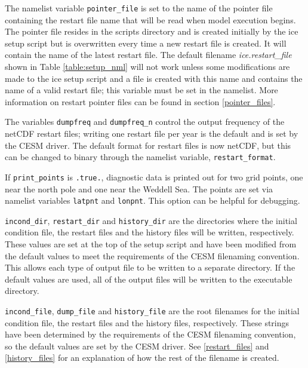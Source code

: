 The namelist variable {\tt pointer\_file} is set to the name of the pointer file
containing the restart file name that will be read when model execution
begins.  The pointer file resides in the scripts directory and is created 
initially by the ice setup script but is overwritten every time a new restart 
file is created.  It will contain the name of the latest restart file.  The 
default filename {\it ice.restart\_file} shown in Table 
\ref{table:setup_nml} will not work unless some modifications are made to 
the ice setup script and a file is created with this name and contains the name 
of a valid restart file; this variable must be set in the namelist.  More 
information on restart pointer files can be found in section \ref{pointer_files}.

The variables {\tt dumpfreq} and {\tt dumpfreq\_n} control the 
output frequency of the netCDF restart files; writing one restart file per 
year is the default and is set by the CESM driver. The default format for
restart files is now netCDF, but this can be changed to binary through
the namelist variable, {\tt restart\_format}.

If {\tt print\_points} is {\tt .true.}, diagnostic data is printed out for two
grid points, one near the north pole and one near the Weddell Sea.  The points
are set via namelist variables {\tt latpnt} and {\tt lonpnt}.  This option can 
be helpful for debugging.

{\tt incond\_dir}, {\tt restart\_dir} and {\tt history\_dir} are the directories
where the initial condition file, the restart files and the history files will
be written, respectively.  These values are set at the top of the setup script
and have been modified from the default values to meet the requirements of the
CESM filenaming convention.  This allows each type of output file to be written
to a separate directory.  If the default values are used, all of the output
files will be written to the executable directory.

{\tt incond\_file}, {\tt dump\_file} and {\tt history\_file} are the root
filenames for the initial condition file, the restart files and the history 
files, respectively.  These strings have been determined by the requirements 
of the CESM filenaming convention, so the default values are set by the CESM
driver.  See \ref{restart_files} and \ref{history_files} for an explanation 
of how the rest of the filename is created.

